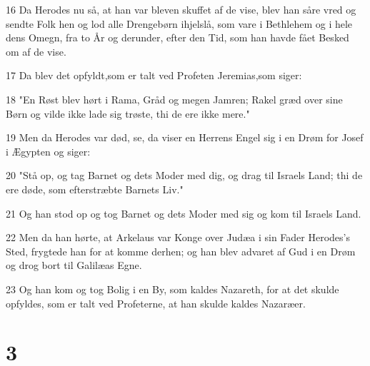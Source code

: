 \par 16 Da Herodes nu så, at han var bleven skuffet af de vise, blev han såre vred og sendte Folk hen og lod alle Drengebørn ihjelslå, som vare i Bethlehem og i hele dens Omegn, fra to År og derunder, efter den Tid, som han havde fået Besked om af de vise.
\par 17 Da blev det opfyldt,som er talt ved Profeten Jeremias,som siger:
\par 18 "En Røst blev hørt i Rama, Gråd og megen Jamren; Rakel græd over sine Børn og vilde ikke lade sig trøste, thi de ere ikke mere."
\par 19 Men da Herodes var død, se, da viser en Herrens Engel sig i en Drøm for Josef i Ægypten og siger:
\par 20 "Stå op, og tag Barnet og dets Moder med dig, og drag til Israels Land; thi de ere døde, som efterstræbte Barnets Liv."
\par 21 Og han stod op og tog Barnet og dets Moder med sig og kom til Israels Land.
\par 22 Men da han hørte, at Arkelaus var Konge over Judæa i sin Fader Herodes's Sted, frygtede han for at komme derhen; og han blev advaret af Gud i en Drøm og drog bort til Galilæas Egne.
\par 23 Og han kom og tog Bolig i en By, som kaldes Nazareth, for at det skulde opfyldes, som er talt ved Profeterne, at han skulde kaldes Nazaræer.

\chapter{3}

